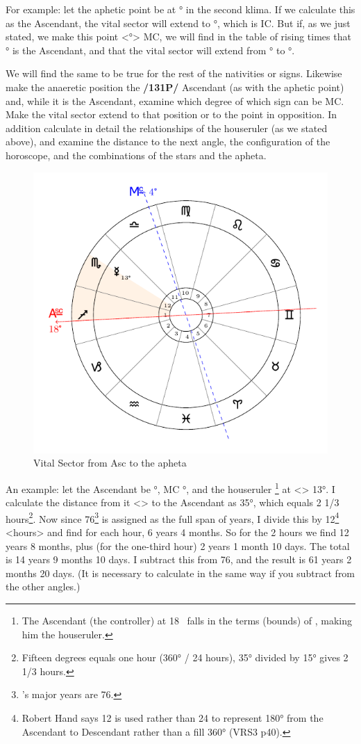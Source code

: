 For example: let the aphetic point be at \Scorpio\xspace 12° in the second klima. If we calculate this as the Ascendant, the vital sector will extend to \Aquarius\xspace 13°, which is IC. But if, as we just stated, we make this point <\Scorpio\xspace 12°> MC, we will find in the table of rising times that \Capricorn\xspace 28° is the Ascendant, and that the vital sector will extend from \Scorpio\xspace 12° to \Capricorn\xspace 28°. 

We will find the same to be true for the rest of the nativities or signs. Likewise make the anaeretic position the \textbf{/131P/} Ascendant (as with the aphetic point) and, while it is
the Ascendant, examine which degree of which sign can be MC. Make the vital sector extend to that position or to the point in opposition. In addition calculate in detail the relationships of the houseruler (as we stated above), and examine the distance to the next angle, the configuration of the horoscope, and the combinations of the stars and the apheta.

\begin{figure}[H]
\centering
\includegraphics[width=.7\textwidth]{charts/3_03_2}
\caption{Vital Sector from Asc to the apheta}
\end{figure}

An example: let the Ascendant be \Sagittarius\xspace 18°, MC \Libra\xspace 4°, and the houseruler \Mercury\xspace\footnote{The Ascendant (the controller) at 18 \Sagittarius\, falls in the terms (bounds) of \Mercury, making him the houseruler.} at
<\Scorpio> 13°. I calculate the distance from it <\Mercury> to the Ascendant as 35°, which equals 2 1/3 hours\footnote{Fifteen degrees equals one hour (360° / 24 hours), 35° divided by 15° gives 2 1/3 hours.}. Now since 76\footnote{\Mercury's major years are 76.} is assigned as the full span of years, I divide this by 12\footnote{Robert Hand says 12 is used rather than 24 to represent 180° from the Ascendant to Descendant rather than a fill 360° (VRS3 p40).} <hours> and find for each hour, 6 years 4 months. So for the 2 hours we find 12 years 8 months, plus (for the one-third hour) 2 years 1 month 10 days. The total is 14 years 9 months 10 days. I subtract this from 76, and the result is 61 years 2 months 20 days. (It is necessary to calculate in the same way if you subtract from the other angles.)

